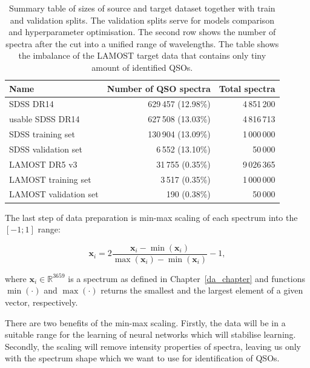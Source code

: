 \begin{table}
\begin{center}
\begin{tabular}{|l|r|r|}
	\hline
	Name & Number of QSO spectra & Total spectra \\ \hline \hline
	SDSS DR14 & 629\,457 (12.98\%) & 4\,851\,200 \\ \hline
	usable SDSS DR14 & 627\,508 (13.03\%) & 4\,816\,713 \\ \hline
	SDSS training set & 130\,904 (13.09\%) & 1\,000\,000 \\ \hline
	SDSS validation set & 6\,552 (13.10\%) & 50\,000 \\ \hline
	LAMOST DR5 v3 & 31\,755 (0.35\%) & 9\,026\,365 \\ \hline
	LAMOST training set & 3\,517 (0.35\%) & 1\,000\,000 \\ \hline
	LAMOST validation set & 190 (0.38\%) & 50\,000 \\ \hline
\end{tabular}
\end{center}
\caption[Sizes of source and target datasets]{
	Summary table of sizes of source and target dataset
	together with train and validation splits.
	The validation splits serve for models comparison
	and hyperparameter optimisation.
	The second row shows the number of spectra
	after the cut into a unified range of wavelengths.
	The table shows the imbalance of the LAMOST target data
	that contains only tiny amount of identified QSOs.
	}
\label{datasets_sizes}
\end{table}

The last step of data preparation is min-max scaling of each spectrum into the \([-1; 1]\) range:

\begin{equation}
	\mathbf{x}_i = 2 \frac{\mathbf{x}_i - \min(\mathbf{x}_i)}{
		\max(\mathbf{x}_i) - \min(\mathbf{x}_i)} - 1,
\end{equation}

where \(\mathbf{x}_i \in \mathbb{R}^{3659}\) is a spectrum as defined in Chapter~\ref{da_chapter}
and functions \(\min(\cdot)\) and \(\max(\cdot)\) returns the smallest and the largest element of a given vector, respectively.

There are two benefits of the min-max scaling.
Firstly, the data will be in a suitable range for the learning of neural networks
which will stabilise learning.
Secondly, the scaling will remove intensity properties of spectra,
leaving us only with the spectrum shape
which we want to use for identification of QSOs.

